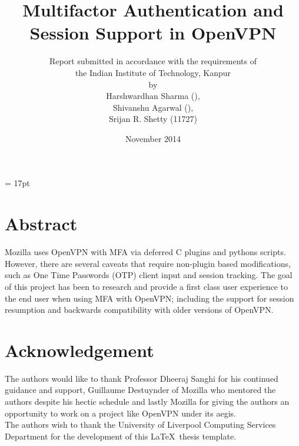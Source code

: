 \documentclass[11pt,oneside]{book}
\begin{document}
\baselineskip = 17pt

\title{Multifactor Authentication and Session Support in OpenVPN}
\author{Report submitted in accordance with the requirements of \\
the Indian Institute of Technology, Kanpur \\
by \\
Harshwardhan Sharma (),\\
Shivanshu Agarwal (),\\
Srijan R. Shetty (11727)}
\date{November 2014}
\maketitle
\frontmatter

\chapter{Abstract}
Mozilla uses OpenVPN with MFA via deferred C plugins and pythons scripts.
However, there are several caveats that require non-plugin based modifications,
such as One Time Passwords (OTP) client input and session tracking.
The goal of this project has been to research and provide a first class user experience
to the end user when using MFA with OpenVPN; including the support for session resumption
and backwards compatibility with older versions of OpenVPN.

\tableofcontents
{}

\listoffigures
{}


\chapter{Acknowledgement}
The authors would like to thank Professor Dheeraj Sanghi for his continued guidance
and support, Guillaume Destuynder of Mozilla who mentored the authors despite his
hectic schedule and lastly Mozilla for giving the authors an opportunity to work on
a project like OpenVPN under its aegis.\\
The authors wish to thank the University of
Liverpool Computing Services Department for the development of this
\LaTeX \ thesis template.

\printglossary
{}
\end{document}
